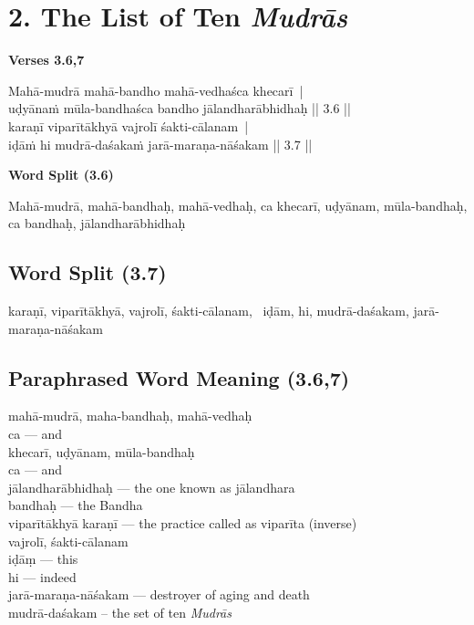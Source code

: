 \section*{2. The List of Ten \textit{Mudrās}}

\noindent 
\textbf{Verses 3.6,7}

\begin{shloka}
Mahā-mudrā mahā-bandho mahā-vedhaśca khecarī |\\
uḍyānaṁ mūla-bandhaśca bandho jālandharābhidhaḥ || 3.6 ||\\
karaṇī viparītākhyā vajrolī śakti-cālanam |\\
iḍāṁ hi mudrā-daśakaṁ jarā-maraṇa-nāśakam || 3.7 ||
\end{shloka}

\noindent 
\textbf{Word Split (3.6)}

Mahā-mudrā, mahā-bandhaḥ, mahā-vedhaḥ, ca khecarī, uḍyānam, mūla-bandhaḥ, ca bandhaḥ, jālandharābhidhaḥ 

\subsection*{Word Split (3.7)}

karaṇī, viparītākhyā, vajrolī, śakti-cālanam,  iḍām, hi, mudrā-daśakam, jarā-maraṇa-nāśakam 

\subsection*{Paraphrased Word Meaning (3.6,7)}

\begin{multicols}{2}
mahā-mudrā, maha-bandhaḥ, mahā-vedhaḥ \\
ca  --- and \\
khecarī, uḍyānam, mūla-bandhaḥ \\
ca  --- and \\
jālandharābhidhaḥ --- the one known as jālandhara\\
bandhaḥ --- the Bandha \\
viparītākhyā karaṇī --- the practice called as viparīta (inverse)\\
vajrolī, śakti-cālanam \\
iḍāṃ --- this \\
hi --- indeed \\
jarā-maraṇa-nāśakam --- destroyer of aging and death\\
mudrā-daśakam – the set of ten \textit{Mudrās}
\end{multicols}

